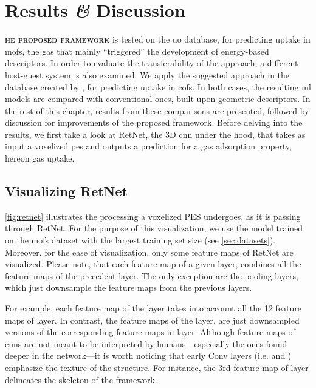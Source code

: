 \chapter{Results \textit{\&} Discussion}

\lettrine[
	nindent=0em, findent=0.5em, loversize=-0.12, lines=5
]{}{\bfseries\color{Blue}he proposed framework} is tested on the
\gls{uo} database, for predicting  uptake in \glspl{mof}, the
gas that mainly ``triggered'' the development of energy-based
descriptors. In order to evaluate the
transferability of the approach, a different host-guest system is also examined.
We apply the suggested approach in the database created by
\textcite{Mercado_2018}, for predicting  uptake in \glspl{cof}. In both
cases, the resulting \gls{ml} models are compared with conventional ones, built
upon geometric descriptors. In the rest of this
chapter, results from these comparisons are presented, followed by discussion
for improvements of the proposed framework. Before delving into the results, we
first take a look at RetNet, the 3D \gls{cnn} under the hood, that
takes as input a voxelized \gls{pes} and outputs a
prediction for a gas adsorption property, hereon gas
uptake.

\section{Visualizing RetNet}

\Figure{} \ref{fig:retnet} illustrates the processing a voxelized PES undergoes, as
it is passing through RetNet. For the purpose of this visualization, we use the
model trained on the \glspl{mof} dataset with the largest training set size (see
\Section{} \ref{sec:datasets}). Moreover, for the ease of visualization, only some
feature maps of RetNet are visualized. Please note, that each feature
map of a given layer, combines all the feature maps of the
precedent layer. The only exception are the pooling layers,
which just downsample the feature maps from the previous
layers.

For example, each feature map of the  layer takes into account all
the 12 feature maps of  layer. In contrast, the feature maps of the
 layer, are just downsampled versions of the corresponding feature maps
in  layer. Although feature maps of \glspl{cnn} are not meant to be
interpreted by humans---especially the ones found deeper in the network---it is
worth noticing that early Conv layers (i.e.  and
) emphasize the texture of the structure. For instance, the 3rd
feature map of  layer delineates the skeleton of the framework.

